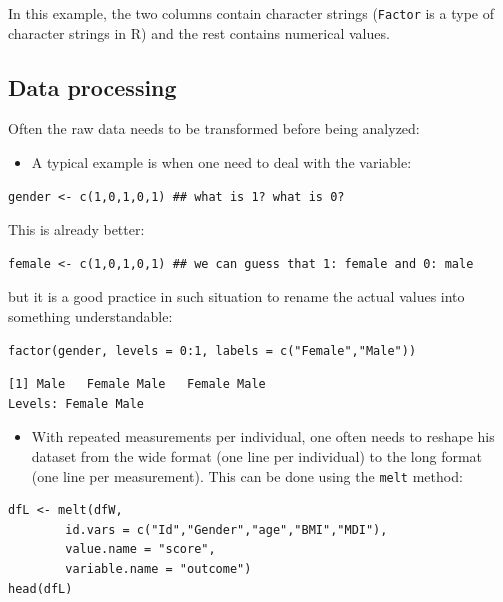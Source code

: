 \documentclass{article}
\begin{document}
In this example, the two columns contain character strings (\texttt{Factor}
is a type of character strings in R) and the rest contains numerical
values.

\subsection{Data processing}
\label{sec:org397e56f}

Often the raw data needs to be transformed before being analyzed:
\begin{itemize}
\item A typical example is when one need to deal with the variable:
\end{itemize}
\lstset{language=r,label= ,caption= ,captionpos=b,numbers=none}
\begin{lstlisting}
gender <- c(1,0,1,0,1) ## what is 1? what is 0?
\end{lstlisting}

This is already better:
\lstset{language=r,label= ,caption= ,captionpos=b,numbers=none}
\begin{lstlisting}
female <- c(1,0,1,0,1) ## we can guess that 1: female and 0: male
\end{lstlisting}
but it is a good practice in such situation to rename the actual
values into something understandable:
\lstset{language=r,label= ,caption= ,captionpos=b,numbers=none}
\begin{lstlisting}
factor(gender, levels = 0:1, labels = c("Female","Male"))
\end{lstlisting}

\begin{verbatim}
[1] Male   Female Male   Female Male  
Levels: Female Male
\end{verbatim}

\begin{itemize}
\item With repeated measurements per individual, one often needs to
reshape his dataset from the wide format (one line per individual)
to the long format (one line per measurement). This can be done
using the \texttt{melt} method:
\end{itemize}
\lstset{language=r,label= ,caption= ,captionpos=b,numbers=none}
\begin{lstlisting}
dfL <- melt(dfW, 
	    id.vars = c("Id","Gender","age","BMI","MDI"),
	    value.name = "score",
	    variable.name = "outcome")
head(dfL)
\end{lstlisting}
\end{document}
